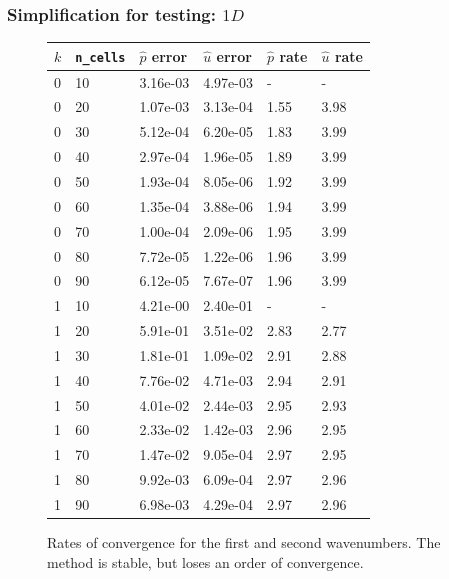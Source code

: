 \documentclass[8pt]{beamer}
\begin{document}
\begin{frame}
    \frametitle{Simplification for testing: \(1D\)}
    \begin{figure}
        \centering
        \begin{tabular}{| l | l | l | l | l | l |}
            \hline
            \(k\) & \texttt{n\_cells} &
            \(\hat{p}\) error & \(\hat{u}\) error &
            \(\hat{p}\) rate & \(\hat{u}\) rate                               \\
            \hline
            0 & 10 & 3.16e-03 & 4.97e-03 & -    & -                           \\
            0 & 20 & 1.07e-03 & 3.13e-04 & 1.55 & 3.98                        \\
            0 & 30 & 5.12e-04 & 6.20e-05 & 1.83 & 3.99                        \\
            0 & 40 & 2.97e-04 & 1.96e-05 & 1.89 & 3.99                        \\
            0 & 50 & 1.93e-04 & 8.05e-06 & 1.92 & 3.99                        \\
            0 & 60 & 1.35e-04 & 3.88e-06 & 1.94 & 3.99                        \\
            0 & 70 & 1.00e-04 & 2.09e-06 & 1.95 & 3.99                        \\
            0 & 80 & 7.72e-05 & 1.22e-06 & 1.96 & 3.99                        \\
            0 & 90 & 6.12e-05 & 7.67e-07 & 1.96 & 3.99                        \\
            \hline
            1 & 10 & 4.21e-00 & 2.40e-01 & -    & -                           \\
            1 & 20 & 5.91e-01 & 3.51e-02 & 2.83 & 2.77                        \\
            1 & 30 & 1.81e-01 & 1.09e-02 & 2.91 & 2.88                        \\
            1 & 40 & 7.76e-02 & 4.71e-03 & 2.94 & 2.91                        \\
            1 & 50 & 4.01e-02 & 2.44e-03 & 2.95 & 2.93                        \\
            1 & 60 & 2.33e-02 & 1.42e-03 & 2.96 & 2.95                        \\
            1 & 70 & 1.47e-02 & 9.05e-04 & 2.97 & 2.95                        \\
            1 & 80 & 9.92e-03 & 6.09e-04 & 2.97 & 2.96                        \\
            1 & 90 & 6.98e-03 & 4.29e-04 & 2.97 & 2.96                        \\
            \hline
        \end{tabular}

        \caption{Rates of convergence for the first and second wavenumbers. The
        method is stable, but loses an order of convergence.}
    \end{figure}
\end{frame}
\end{document}
